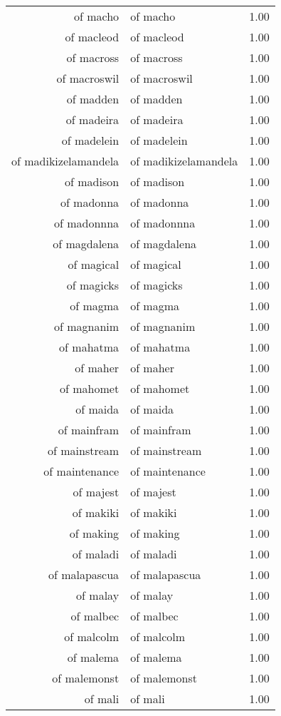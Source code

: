 \begin{table}[ht]
\begin{tabular}{rlr}
  of macho & of macho & 1.00 \\ 
  of macleod & of macleod & 1.00 \\ 
  of macross & of macross & 1.00 \\ 
  of macroswil & of macroswil & 1.00 \\ 
  of madden & of madden & 1.00 \\ 
  of madeira & of madeira & 1.00 \\ 
  of madelein & of madelein & 1.00 \\ 
  of madikizelamandela & of madikizelamandela & 1.00 \\ 
  of madison & of madison & 1.00 \\ 
  of madonna & of madonna & 1.00 \\ 
  of madonnna & of madonnna & 1.00 \\ 
  of magdalena & of magdalena & 1.00 \\ 
  of magical & of magical & 1.00 \\ 
  of magicks & of magicks & 1.00 \\ 
  of magma & of magma & 1.00 \\ 
  of magnanim & of magnanim & 1.00 \\ 
  of mahatma & of mahatma & 1.00 \\ 
  of maher & of maher & 1.00 \\ 
  of mahomet & of mahomet & 1.00 \\ 
  of maida & of maida & 1.00 \\ 
  of mainfram & of mainfram & 1.00 \\ 
  of mainstream & of mainstream & 1.00 \\ 
  of maintenance & of maintenance & 1.00 \\ 
  of majest & of majest & 1.00 \\ 
  of makiki & of makiki & 1.00 \\ 
  of making & of making & 1.00 \\ 
  of maladi & of maladi & 1.00 \\ 
  of malapascua & of malapascua & 1.00 \\ 
  of malay & of malay & 1.00 \\ 
  of malbec & of malbec & 1.00 \\ 
  of malcolm & of malcolm & 1.00 \\ 
  of malema & of malema & 1.00 \\ 
  of malemonst & of malemonst & 1.00 \\ 
  of mali & of mali & 1.00 \\ 

\end{tabular}
\end{table}
